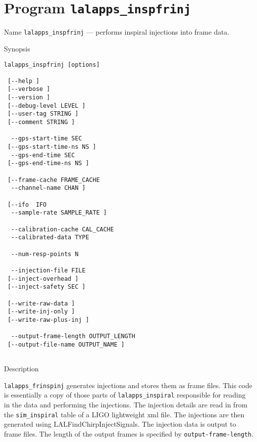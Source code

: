 \section{Program \texttt{lalapps\_inspfrinj}}
\label{program:lalapps-inspfrinj}

\begin{entry}
\item[Name]
\verb$lalapps_inspfrinj$ --- performs inspiral injections into frame data.

\item[Synopsis]
\begin{verbatim}
lalapps_inspfrinj [options]
 
 [--help ]       
 [--verbose ]   
 [--version ]  
 [--debug-level LEVEL ]   
 [--user-tag STRING ]     
 [--comment STRING ]    
 
  --gps-start-time SEC
 [--gps-start-time-ns NS ] 
  --gps-end-time SEC     
 [--gps-end-time-ns NS ] 
 
 [--frame-cache FRAME_CACHE    
  --channel-name CHAN ]  
 
 [--ifo  IFO       
  --sample-rate SAMPLE_RATE ] 

  --calibration-cache CAL_CACHE 
  --calibrated-data TYPE  
  
  --num-resp-points N    
 
  --injection-file FILE
 [--inject-overhead ]  
 [--inject-safety SEC ]
 
 [--write-raw-data ] 
 [--write-inj-only ]
 [--write-raw-plus-inj ]
 
  --output-frame-length OUTPUT_LENGTH
 [--output-file-name OUTPUT_NAME ]
 
\end{verbatim}

\item[Description] 

\texttt{lalapps\_frinspinj} generates injections and stores them as
frame files.  This code is essentially a copy of those parts of
\texttt{lalapps\_inspiral} responsible for reading in the data and
performing the injections.  The injection details are read in from the
\texttt{sim\_inspiral} table of a LIGO lightweight xml file.  The
injections are then generated using LALFindChirpInjectSignals.  The
injection data is output to frame files.  The length of the output
frames is specified by \texttt{output-frame-length}.


\end{entry}
